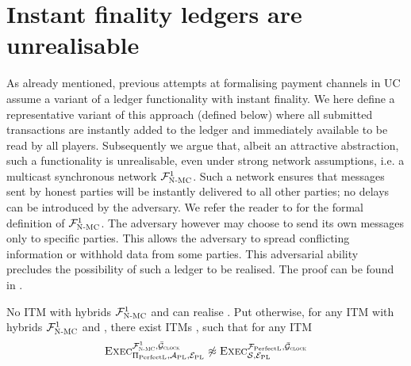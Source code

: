 \section{Instant finality ledgers are unrealisable}
\label{sec:perfect-ledger}
  As already mentioned, previous attempts at formalising payment channels in
  UC~\cite{DBLP:conf/ccs/DziembowskiFH18,Malavolta:2017:CPP:3133956.3134096,sprites,perun}
  assume a variant of a ledger functionality with instant finality. We here
  define a representative variant of this approach \perfectledger{} (defined
  below) where all submitted transactions are instantly added to the ledger and
  immediately available to be read by all players. Subsequently we argue that,
  albeit an attractive abstraction, such a functionality is unrealisable, even
  under strong network assumptions, i.e. a multicast synchronous network
  $\mathcal{F}_{\textsc{N-MC}}^1$. Such a network ensures that messages sent by honest parties
  will be instantly delivered to all other parties; no delays can be introduced
  by the adversary. We refer the reader to  for the formal definition of $\mathcal{F}_{\textsc{N-MC}}^1$. The
  adversary however may choose to send its own messages only to specific
  parties. This allows the adversary to spread conflicting information or
  withhold data from some parties. This adversarial ability precludes the
  possibility of such a ledger to be realised. The  proof can
  be found in .

  \begin{theorem}
    \label{theorem:perfectledger}
    No ITM \perfectprot{} with hybrids $\mathcal{F}_{\textsc{N-MC}}^1$ and \gFclock can realise
    \perfectledger. Put otherwise, for any ITM \perfectprot{} with hybrids
    $\mathcal{F}_{\textsc{N-MC}}^1$ and \gFclock, there exist ITMs \perfectenv, \perfectadv{}
    such that for any ITM \simulator
    \begin{equation*}
      \textsc{Exec}^{\mathcal{F}_{\textsc{N-MC}}^1, \bar{\mathcal{G}}_{\textsc{clock}}}_{\Pi_{\mathrm{PerfectL}},
      \mathcal{A}_{\mathrm{PL}}, \mathcal{E}_{\mathrm{PL}}} \not\approx
      \textsc{Exec}^{\mathcal{F}_{\mathrm{PerfectL}}, \bar{\mathcal{G}}_{\textsc{clock}}}_{\mathcal{S},
      \mathcal{E}_{\mathrm{PL}}}
    \end{equation*}
  \end{theorem}

